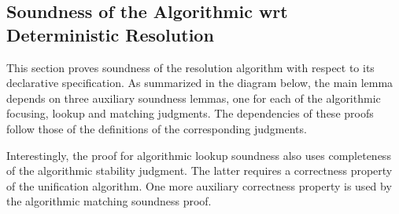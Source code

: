 \subsection{Soundness of the Algorithmic wrt Deterministic Resolution}
\label{proof:alg_soundness}
This section proves soundness of the resolution algorithm with respect to its declarative
specification. As summarized in the diagram below, the main lemma depends on three auxiliary
soundness lemmas, one for each of the algorithmic focusing, lookup and matching judgments.
The dependencies of these proofs follow those of the definitions of the
corresponding judgments.

Interestingly, the proof for algorithmic lookup soundness also uses
completeness of the algorithmic stability judgment. The latter requires a correctness property
of the unification algorithm. One more auxiliary correctness property is used by the
algorithmic matching soundness proof.

